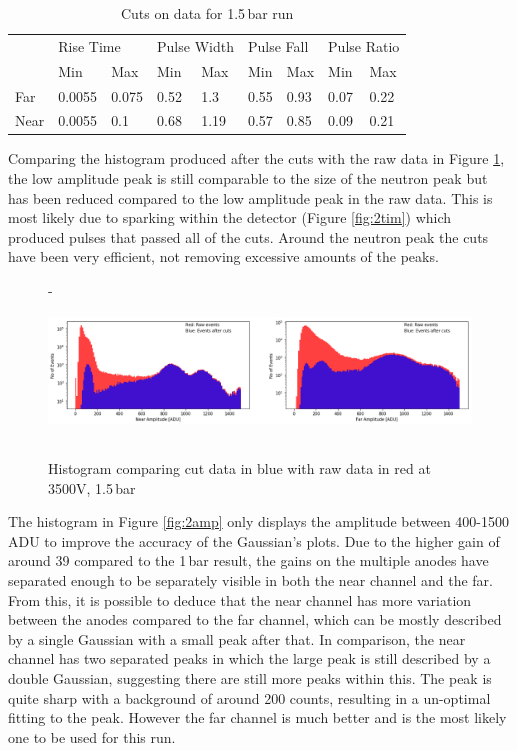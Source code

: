 \documentclass[a4paper]{article}
\begin{document}
\begin{table}
\centering
\caption{Cuts on data for 1.5\,bar run}
\label{tb:15bar}
\begin{tabular}{|l|ll|ll|ll|ll|} 
\cline{2-9}
\multicolumn{1}{l|}{} & \multicolumn{2}{l|}{Rise Time}   & \multicolumn{2}{l|}{Pulse Width} & \multicolumn{2}{l|}{Pulse Fall} & \multicolumn{2}{l|}{Pulse Ratio}  \\ 
\cline{2-9}
\multicolumn{1}{l|}{} & \multicolumn{1}{l|}{Min} & Max   & \multicolumn{1}{l|}{Min} & Max   & \multicolumn{1}{l|}{Min} & Max  & \multicolumn{1}{l|}{Min} & Max    \\ 
\hline
Far                   & 0.0055                   & 0.075 & 0.52                     & 1.3   & 0.55                     & 0.93 & 0.07                     & 0.22   \\ 
\hline
Near                  & 0.0055                   & 0.1   & 0.68                     & 1.19  & 0.57                     & 0.85 & 0.09                     & 0.21   \\
\hline
\end{tabular}
\end{table}
\noindent Comparing the histogram produced after the cuts with the raw data in Figure \ref{fig:2com}, the low amplitude peak is still comparable to the size of the neutron peak but has been reduced compared to the low amplitude peak in the raw data. This is most likely due to sparking within the detector (Figure \ref{fig:2tim}) which produced pulses that passed all of the cuts. Around the neutron peak the cuts have been very efficient, not removing excessive amounts of the peaks.
\begin{figure}[H]-
    \centering
    \includegraphics[height=3.7cm]{uk24n002_ampcomp.png}
    \caption{Histogram comparing cut data in blue with raw data in red at 3500V, 1.5\,bar}
    \label{fig:2com}
\end{figure}
\noindent The histogram in Figure \ref{fig:2amp} only displays the amplitude between 400-1500\,ADU to improve the accuracy of the Gaussian's plots. Due to the higher gain of around 39 compared to the 1\,bar result, the gains on the multiple anodes have separated enough to be separately visible in both the near channel and the far. From this, it is possible to deduce that the near channel has more variation between the anodes compared to the far channel, which can be mostly described by a single Gaussian with a small peak after that. In comparison, the near channel has two separated peaks in which the large peak is still described by a double Gaussian, suggesting there are still more peaks within this. The peak is quite sharp with a background of around 200 counts, resulting in a un-optimal fitting to the peak. However the far channel is much better and is the most likely one to be used for this run.
\end{document}
